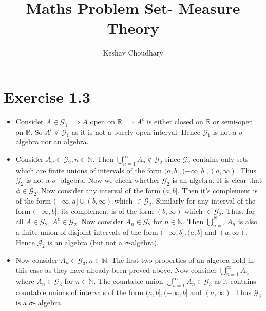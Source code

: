 \documentclass{article}
\title{Maths Problem Set- Measure Theory}
\author{Keshav Choudhary}
\date{}
\begin{document}
  \maketitle

  \section*{Exercise 1.3}
    \begin{itemize}

      \item Consider $A \in \mathcal{G}_1 \implies A$ open on $\mathbb{R}\implies {A}^c$
      is either closed on $\mathbb{R}$ or semi-open on $\mathbb{R}$. So ${A}^c \notin \mathcal{G}_1$
      as it is not a purely open interval. Hence $\mathcal{G}_1$ is not a $\sigma$- algebra nor an algebra.

      \item Consider $A_n \in \mathcal{G}_2, n \in \mathbb{N}$. Then $\bigcup_{n=1}^{\infty}A_n \notin \mathcal{G}_2$
      since $\mathcal{G}_2$ contains only sets which are finite unions of intervals of the form $(a, b], (-\infty, b], (a, \infty)$.
      Thus $\mathcal{G}_2$ is not a $\sigma$- algebra. Now we check whether $\mathcal{G}_2$  is an algebra.
      It is clear that $\phi \in \mathcal{G}_2$. Now consider any interval of the form $(a,b]$.
      Then it's complement is of the form $(-\infty,a] \cup (b, \infty)$ which $\in \mathcal{G}_2$. Similarly for any interval of the form
      $(-\infty, b]$, its complement is of the form $(b, \infty)$ which $\in \mathcal{G}_2$. Thus, for all $A \in \mathcal{G}_2$, ${A}^c \in \mathcal{G}_2$.
      Now consider ${A}_n \in \mathcal{G}_2$ for $n \in \mathbb{N}$. Then $\bigcup_{n=1}^{N}A_{n}$ is also a finite union
      of disjoint intervals of the form $(-\infty, b], (a,b]$ and  $(a, \infty)$. Hence $\mathcal{G}_2$ is an algebra (but not a $\sigma$-algebra).

      \item Now consider $A_n \in \mathcal{G}_3, n \in \mathbb{N}$. The first two properties of an algebra hold in this case
      as they have already been proved above. Now consider $\bigcup_{n=1}^{\infty}A_{n}$ where ${A}_n \in \mathcal{G}_3$ for $n \in \mathbb{N}$.
      The countable union $\bigcup_{n=1}^{\infty}A_{n} \in \mathcal{G}_3$ as it contains countable unions of intervals of the form
      $(a,b], (-\infty, b]$ and $(a, \infty)$. Thus $\mathcal{G}_3$ is a $\sigma$- algebra.

    \end{itemize}
\end{document}

